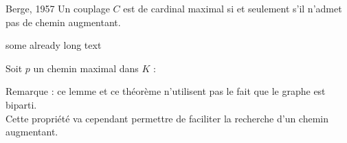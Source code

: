 \documentclass{beamer}
\begin{document}
\begin{frame}
\begin{alertblock}{Berge, 1957}
Un couplage $C$ est de cardinal maximal si et seulement s'il n'admet pas de chemin augmentant.
\end{alertblock}
\pause
\begin{preuve}
some already long text
\end{preuve}
\end{frame}

\begin{frame}
\begin{block}{}

Soit $p$ un chemin maximal dans $K$ : 
\end{block}

Remarque : ce lemme et ce théorème n'utilisent pas le fait que le graphe est biparti.\\
Cette propriété va cependant permettre de faciliter la recherche d'un chemin augmentant.
\end{frame}
\end{document}
